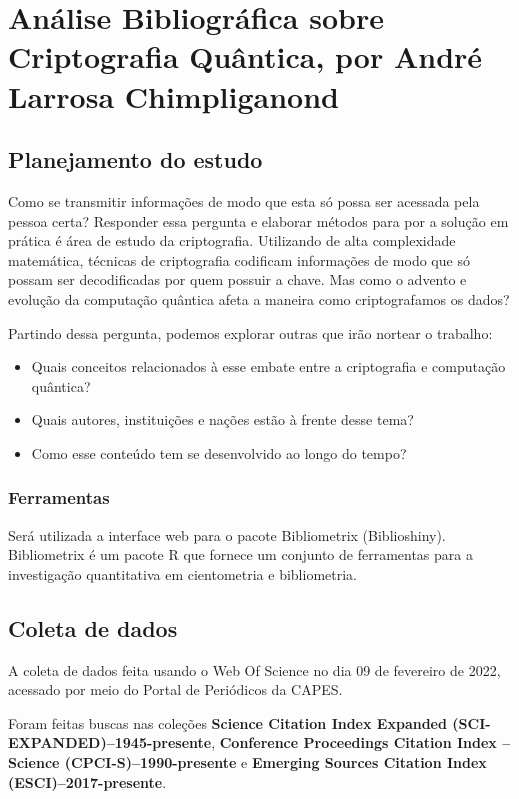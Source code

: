 
\chapter{Análise Bibliográfica sobre Criptografia Quântica, por André Larrosa Chimpliganond}

\section{Planejamento do estudo}
Como se transmitir informações de modo que esta só possa ser acessada pela pessoa certa? Responder essa pergunta e elaborar métodos para por a solução em prática é área de estudo da criptografia. Utilizando de alta complexidade matemática, técnicas de criptografia codificam informações de modo que só possam ser decodificadas por quem possuir a chave. Mas como o advento e evolução da computação quântica afeta a maneira como criptografamos os dados?

Partindo dessa pergunta, podemos explorar outras que irão nortear o trabalho:
\begin{itemize}
    \item Quais conceitos relacionados à esse embate entre a criptografia e computação quântica?
    \item Quais autores, instituições e nações estão à frente desse tema?
    \item Como esse conteúdo tem se desenvolvido ao longo do tempo?
\end{itemize}


\subsection{Ferramentas}
Será utilizada a interface web para o pacote Bibliometrix (Biblioshiny). Bibliometrix é um pacote R que fornece um conjunto de ferramentas para a investigação quantitativa em cientometria e bibliometria.


\section{Coleta de dados}

A coleta de dados feita usando o Web Of Science  no dia 09 de fevereiro de 2022, acessado por meio do Portal de Periódicos da CAPES.

Foram feitas buscas nas coleções \textbf{Science Citation Index Expanded (SCI-EXPANDED)--1945-presente}, \textbf{Conference Proceedings Citation Index – Science (CPCI-S)--1990-presente} e \textbf{Emerging Sources Citation Index (ESCI)--2017-presente}. 

